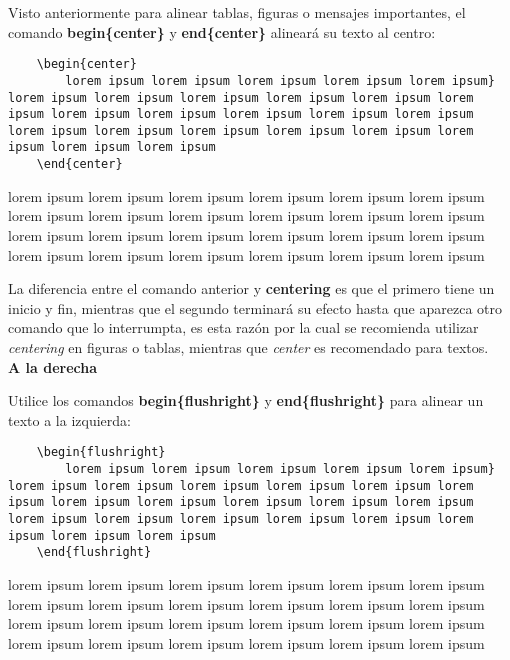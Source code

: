 Visto anteriormente para alinear tablas, figuras o mensajes importantes, el comando \textbf{begin\{center\}} y \textbf{end\{center\}} alineará su texto al centro:
\begin{lstlisting}
    \begin{center}
        lorem ipsum lorem ipsum lorem ipsum lorem ipsum lorem ipsum} lorem ipsum lorem ipsum lorem ipsum lorem ipsum lorem ipsum lorem ipsum lorem ipsum lorem ipsum lorem ipsum lorem ipsum lorem ipsum lorem ipsum lorem ipsum lorem ipsum lorem ipsum lorem ipsum lorem ipsum lorem ipsum lorem ipsum
    \end{center}
\end{lstlisting}
\begin{center}
    lorem ipsum lorem ipsum lorem ipsum lorem ipsum lorem ipsum lorem ipsum lorem ipsum lorem ipsum lorem ipsum lorem ipsum lorem ipsum lorem ipsum lorem ipsum lorem ipsum lorem ipsum lorem ipsum lorem ipsum lorem ipsum lorem ipsum lorem ipsum lorem ipsum lorem ipsum lorem ipsum lorem ipsum 
\end{center}

La diferencia entre el comando anterior y \textbf{centering} es que el primero tiene un inicio y fin, mientras que el segundo terminará su efecto hasta que aparezca otro comando que lo interrumpta, es esta razón por la cual se recomienda utilizar \textit{centering} en figuras o tablas, mientras que \textit{center} es recomendado para textos.
\\
\textbf{A la derecha}

Utilice los comandos \textbf{begin\{flushright\}} y \textbf{end\{flushright\}} para alinear un texto a la izquierda:
\begin{lstlisting}
    \begin{flushright}
        lorem ipsum lorem ipsum lorem ipsum lorem ipsum lorem ipsum} lorem ipsum lorem ipsum lorem ipsum lorem ipsum lorem ipsum lorem ipsum lorem ipsum lorem ipsum lorem ipsum lorem ipsum lorem ipsum lorem ipsum lorem ipsum lorem ipsum lorem ipsum lorem ipsum lorem ipsum lorem ipsum lorem ipsum
    \end{flushright}
\end{lstlisting}
\begin{flushright}
    lorem ipsum lorem ipsum lorem ipsum lorem ipsum lorem ipsum lorem ipsum lorem ipsum lorem ipsum lorem ipsum lorem ipsum lorem ipsum lorem ipsum lorem ipsum lorem ipsum lorem ipsum lorem ipsum lorem ipsum lorem ipsum lorem ipsum lorem ipsum lorem ipsum lorem ipsum lorem ipsum lorem ipsum 
\end{flushright}

